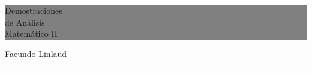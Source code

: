 \begin{titlepage} %
	
	
	\colorbox{grey}{
		\parbox[t]{0.93\textwidth}{ %
			\parbox[t]{0.91\textwidth}{ %
				\raggedleft %
				\fontsize{50pt}{80pt}\selectfont %
				\vspace{0.7cm} %
				
				Demostraciones\\
				de Análisis\\
				Matemático II\\
				
				\vspace{0.7cm} %
			}
		}
	}
	
	\vfill %
	
	
	\parbox[t]{0.93\textwidth}{ %
		\raggedleft %
		\large %
		{\Large Facundo Linlaud}\\[4pt] %
		
		\hfill\rule{0.2\linewidth}{1pt}%
	}

\newpage	
\tableofcontents
\newpage





\end{titlepage}



